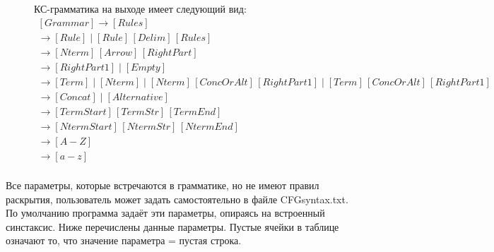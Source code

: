 \documentclass{article}
\begin{document}
\begin{figure}[H]
КС-грамматика на выходе имеет следующий вид:
\centering
        $$\begin{array}{l}
        [Grammar] \to [Rules] \\  
        
        [Rules] \to [Rule] \;|\; [Rule]\,[Delim]\,[Rules] \\

        [Rule] \to [Nterm]\,[Arrow]\,[RightPart]  \\ 
        
        [RightPart] \to [RightPart1] \;|\; [Empty]\\ 

        [RightPart1] \to [Term] \;|\; [Nterm] \;|\; [Nterm]\,[ConcOrAlt]\,[RightPart1] \;|\; [Term]\,[ConcOrAlt]\,[RightPart1] \\
        
        [ConcOrAlt] \to [Concat] \;|\; [Alternative] \\
        
        [Term] \to [TermStart]\,[TermStr]\,[TermEnd] \\
        
        [Nterm] \to [NtermStart]\,[NtermStr]\,[NtermEnd] \\ 
        
        [NtermStr] \to [A-Z] \\
        
        [TermStr] \to [a-z] \\
        \end{array}$$  
\end{figure}
Все параметры, которые встречаются в грамматике, но не имеют правил раскрытия, пользователь может задать самостоятельно в файле CFGsyntax.txt. По умолчанию программа задаёт эти параметры, опираясь на встроенный синстаксис. Ниже перечислены данные параметры. Пустые ячейки в таблице означают то, что значение параметра = пустая строка.
\end{document}
